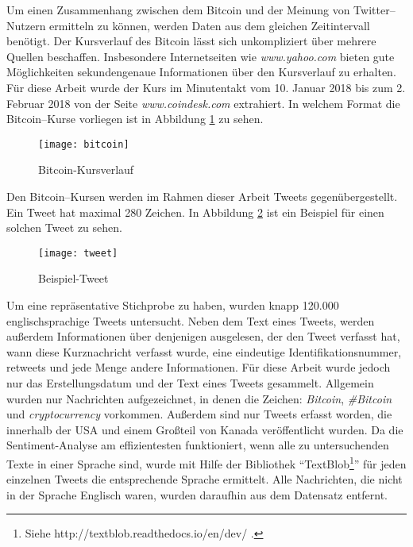 
Um einen Zusammenhang zwischen dem Bitcoin und der Meinung von Twitter--Nutzern ermitteln zu k\"onnen, werden Daten aus dem gleichen Zeitintervall ben\"otigt. Der Kursverlauf des Bitcoin l\"asst sich unkompliziert \"uber mehrere Quellen beschaffen. Insbesondere Internetseiten wie \textit{www.yahoo.com} bieten gute M\"oglichkeiten sekundengenaue Informationen \"uber den Kursverlauf zu erhalten. F\"ur diese Arbeit wurde der Kurs im Minutentakt vom 10. Januar 2018 bis zum 2. Februar 2018 von der Seite \textit{www.coindesk.com} extrahiert. In welchem Format die Bitcoin--Kurse vorliegen ist in Abbildung \ref{fig:bitcoin-course} zu sehen.

\begin{figure}[htb]
	\texttt{[image: bitcoin]}
	\caption{Bitcoin-Kursverlauf}
	\label{fig:bitcoin-course}
\end{figure}

Den Bitcoin--Kursen werden im Rahmen dieser Arbeit Tweets gegen\"ubergestellt. Ein Tweet hat maximal 280 Zeichen. In Abbildung \ref{fig:tweet} ist ein Beispiel für einen solchen Tweet zu sehen. 

\begin{figure}[htb]
	\texttt{[image: tweet]}
	\caption{Beispiel-Tweet}
	\label{fig:tweet}
\end{figure}

Um eine repr\"asentative Stichprobe zu haben, wurden knapp 120.000 englischsprachige Tweets untersucht. Neben dem Text eines Tweets, werden au{\ss}erdem Informationen \"uber denjenigen ausgelesen, der den Tweet verfasst hat, wann diese Kurznachricht verfasst wurde, eine eindeutige Identifikationsnummer, retweets und jede Menge andere Informationen. F\"ur diese Arbeit wurde jedoch nur das Erstellungsdatum und der Text eines Tweets gesammelt. Allgemein wurden nur Nachrichten aufgezeichnet, in denen die Zeichen: \textit{Bitcoin}, \textit{\#Bitcoin} und \textit{cryptocurrency} vorkommen.
Außerdem sind nur Tweets erfasst worden, die innerhalb der USA und einem Gro{\ss}teil von Kanada ver\"offentlicht wurden.
Da die Sentiment-Analyse am effizientesten funktioniert, wenn alle zu untersuchenden Texte in einer Sprache sind, wurde mit Hilfe der Bibliothek \enquote{TextBlob\footnote{Siehe http://textblob.readthedocs.io/en/dev/ .}} f\"ur jeden einzelnen Tweets die entsprechende Sprache ermittelt. Alle Nachrichten, die nicht in der Sprache Englisch waren, wurden daraufhin aus dem Datensatz entfernt.
